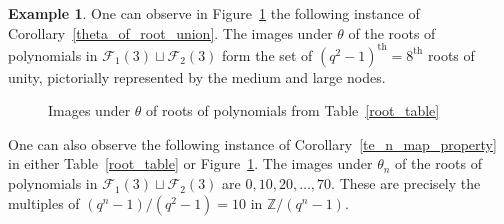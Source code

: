 \documentclass[10pt]{article}
\theoremstyle{definition}
\newtheorem{example}[theorem]{Example}
\newcommand{\CF}{\mathcal{F}}
\newcommand{\Z}{\mathbb{Z}}
\newcommand{\te}{\theta}
\begin{document}
\begin{example}
One can observe in Figure~\ref{root_picture} the following instance of Corollary~\ref{theta_of_root_union}.
The images under \(\te\) of the roots of polynomials in \(\CF_1 (3) \sqcup \CF_2 (3)\) form the set of \((q^2-1)^\text{th} = 8^\text{th}\) roots of unity, pictorially represented by the medium and large nodes.

\begin{figure}
\caption{Images under \(\te\) of roots of polynomials from Table~\ref{root_table}}
\centering
{}
\label{root_picture}
\end{figure}

One can also observe the following instance of Corollary~\ref{te_n_map_property} in either Table~\ref{root_table} or Figure~\ref{root_picture}.
The images under \(\te_n\) of the roots of polynomials in \(\CF_1 (3) \sqcup \CF_2 (3)\) are \(0, 10, 20, \ldots, 70\).
These are precisely the multiples of \((q^n-1)/(q^2-1) = 10\) in \(\Z / (q^n-1)\).
\end{example}
\end{document}
